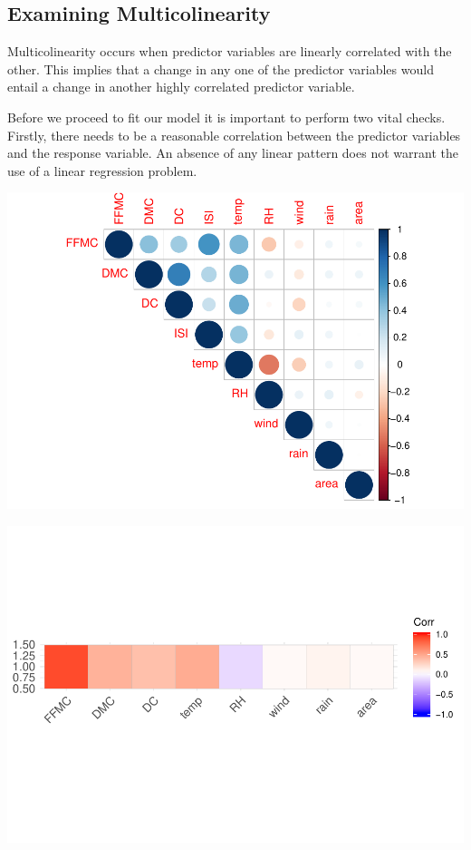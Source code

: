 \documentclass[conference,final,]{IEEEtran}
\makeatletter
\def\maxwidth{\ifdim\Gin@nat@width>\linewidth\linewidth
\else\Gin@nat@width\fi}
\let\Oldincludegraphics\includegraphics
\renewcommand{\includegraphics}[1]{\Oldincludegraphics[width=\maxwidth]{#1}}
\makeatother
\begin{document}
\hypertarget{examining-multicolinearity}{%
\subsection{Examining
Multicolinearity}\label{examining-multicolinearity}}

Multicolinearity occurs when predictor variables are linearly correlated
with the other. This implies that a change in any one of the predictor
variables would entail a change in another highly correlated predictor
variable.

Before we proceed to fit our model it is important to perform two vital
checks. Firstly, there needs to be a reasonable correlation between the
predictor variables and the response variable. An absence of any linear
pattern does not warrant the use of a linear regression problem.

\includegraphics{forest_fires_files/figure-latex/unnamed-chunk-3-1.pdf}

\includegraphics{forest_fires_files/figure-latex/analysis-1.pdf}
\end{document}
